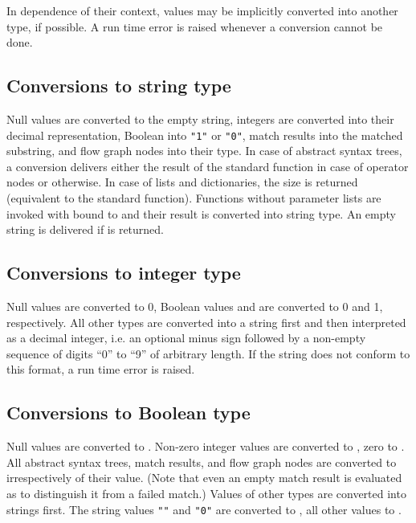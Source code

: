 In dependence of their context, values may be implicitly converted
into another type, if possible. A run time error is raised whenever
a conversion cannot be done.

\subsection{Conversions to string type}\label{functionconv}
\label{stringconv}

Null values are converted to the empty string,
integers are converted into their decimal representation,
Boolean into \lstinline!"1"! or \lstinline!"0"!,
match results into the matched substring, and
flow graph nodes into their type. In case of
abstract syntax trees, a conversion delivers either the result of
the standard function  in case of
operator nodes or  otherwise. In case
of lists and dictionaries, the size is returned (equivalent to the
 standard function). Functions without
parameter lists are invoked with
 bound to  and their result is converted
into string type. An empty string is delivered if  is
returned.

\subsection{Conversions to integer type}\label{intconv}

Null values are converted to 0, Boolean values  and
 are converted to 0 and 1, respectively. All other types are
converted into a string first and then interpreted as a decimal integer,
i.e. an optional minus sign followed by a non-empty sequence of digits
``0'' to ``9'' of arbitrary length. If the string does not conform to
this format, a run time error is raised.

\subsection{Conversions to Boolean type}\label{boolconv}

Null values are converted to .
Non-zero integer values are converted to , zero to .
All abstract syntax trees, match results, and flow graph nodes are
converted to  irrespectively of their value. (Note that
even an empty match result is evaluated as  to distinguish
it from a failed match.) Values of other types are converted into
strings first. The string values \lstinline!""! and \lstinline!"0"!
are converted to , all other values to .

